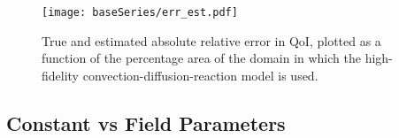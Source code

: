 \begin{figure}[h]
\centering
\texttt{[image: baseSeries/err\_est.pdf]}
\caption{True and estimated absolute relative error in QoI, plotted as a function of the percentage area of the domain in which the high-fidelity convection-diffusion-reaction model is used.}
\label{fig:baseErr}
\end{figure}

\subsection{Constant vs Field Parameters}
